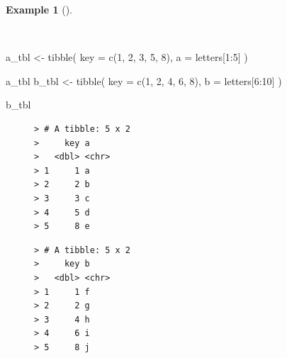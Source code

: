 \documentclass[
  letterpaper,
]{latex/krantz}
\newenvironment{Shaded}{\begin{snugshade}}{\end{snugshade}}
\newcommand{\AttributeTok}[1]{\textcolor[rgb]{0.00,0.00,0.00}{#1}}
\newcommand{\DecValTok}[1]{\textcolor[rgb]{0.00,0.00,0.00}{#1}}
\newcommand{\FunctionTok}[1]{\textcolor[rgb]{0.00,0.00,0.00}{#1}}
\newcommand{\NormalTok}[1]{\textcolor[rgb]{0.00,0.00,0.00}{#1}}
\newcommand{\OtherTok}[1]{\textcolor[rgb]{0.00,0.00,0.00}{#1}}
\newcommand{\SpecialCharTok}[1]{\textcolor[rgb]{0.00,0.00,0.00}{#1}}
\theoremstyle{definition}
\newtheorem{example}{Example}[chapter]
\theoremstyle{remark}
\begin{document}
\begin{example}[]\protect\hypertarget{exm-td-merging-join-dfs}{}\label{exm-td-merging-join-dfs}

~

\begin{Shaded}
\begin{Highlighting}[]
\NormalTok{a\_tbl }\OtherTok{\textless{}{-}}
  \FunctionTok{tibble}\NormalTok{(}
    \AttributeTok{key =} \FunctionTok{c}\NormalTok{(}\DecValTok{1}\NormalTok{, }\DecValTok{2}\NormalTok{, }\DecValTok{3}\NormalTok{, }\DecValTok{5}\NormalTok{, }\DecValTok{8}\NormalTok{),}
    \AttributeTok{a =}\NormalTok{ letters[}\DecValTok{1}\SpecialCharTok{:}\DecValTok{5}\NormalTok{]}
\NormalTok{  )}

\NormalTok{a\_tbl}
\NormalTok{b\_tbl }\OtherTok{\textless{}{-}}
  \FunctionTok{tibble}\NormalTok{(}
    \AttributeTok{key =} \FunctionTok{c}\NormalTok{(}\DecValTok{1}\NormalTok{, }\DecValTok{2}\NormalTok{, }\DecValTok{4}\NormalTok{, }\DecValTok{6}\NormalTok{, }\DecValTok{8}\NormalTok{),}
    \AttributeTok{b =}\NormalTok{ letters[}\DecValTok{6}\SpecialCharTok{:}\DecValTok{10}\NormalTok{]}
\NormalTok{  )}

\NormalTok{b\_tbl}
\end{Highlighting}
\end{Shaded}

\begin{figure}

\begin{minipage}{0.50\linewidth}

\begin{verbatim}
> # A tibble: 5 x 2
>     key a    
>   <dbl> <chr>
> 1     1 a    
> 2     2 b    
> 3     3 c    
> 4     5 d    
> 5     8 e
\end{verbatim}

\end{minipage}%
%
\begin{minipage}{0.50\linewidth}

\begin{verbatim}
> # A tibble: 5 x 2
>     key b    
>   <dbl> <chr>
> 1     1 f    
> 2     2 g    
> 3     4 h    
> 4     6 i    
> 5     8 j
\end{verbatim}

\end{minipage}%

\end{figure}%

\end{example}
\end{document}
